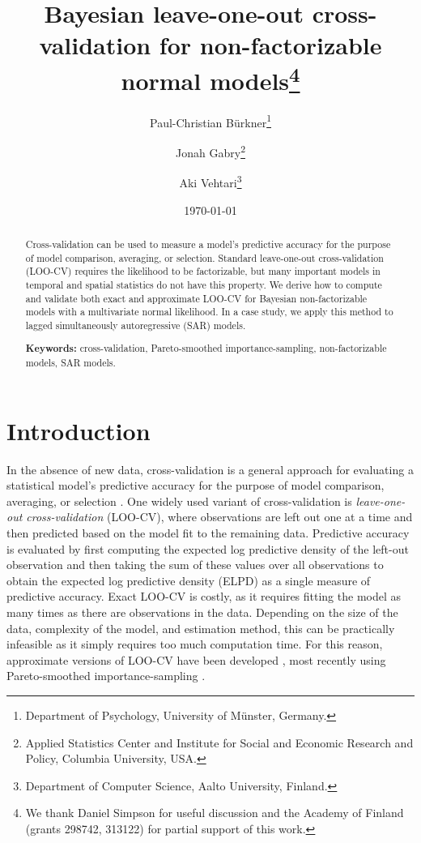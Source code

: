 \documentclass[11pt]{article}
\title{\bf Bayesian leave-one-out cross-validation for non-factorizable normal models\footnote{
We thank Daniel Simpson for useful discussion and the Academy of Finland
(grants 298742, 313122) for partial support of this work.
}\vspace{.1in}}
\author{Paul-Christian B\"{u}rkner\footnote{Department of Psychology, University of M\"{u}nster, Germany.}
  \and Jonah Gabry\footnote{Applied Statistics Center and Institute for Social and Economic Research and Policy, Columbia University, USA.}
  \and Aki Vehtari\footnote{Department of Computer Science, Aalto University, Finland.
}\vspace{.1in}}
\date{\today \vspace{-.1in}}
\begin{document}
\sloppy
\maketitle
\thispagestyle{empty}

\begin{abstract}
Cross-validation can be used to measure a model's predictive accuracy for the
purpose of model comparison, averaging, or selection. Standard leave-one-out
cross-validation  (LOO-CV) requires the likelihood to be factorizable, but many
important models in temporal  and spatial statistics do not have this property.
We derive how to compute and validate both exact and approximate LOO-CV for
Bayesian non-factorizable models with a multivariate normal likelihood.
In a case study, we apply this method to lagged simultaneously autoregressive 
(SAR) models.

\textbf{Keywords:} cross-validation, Pareto-smoothed importance-sampling,
  non-factorizable models, SAR models.
\end{abstract}


\section{Introduction}

In the absence of new data, cross-validation is a general approach for evaluating
a statistical model's predictive accuracy for the purpose of model comparison, 
averaging, or selection \citep{geisser1979, hoeting1999, ando2010, vehtari2012}.
One widely used variant of
cross-validation is \emph{leave-one-out cross-validation} (LOO-CV), where
observations are left out one at a time and then predicted based on the model
fit to the remaining data. Predictive accuracy is evaluated by first computing
the expected log predictive density of the left-out observation and then taking
the sum of these values over all observations to obtain the expected log
predictive density (ELPD) as a single measure of predictive accuracy.
Exact LOO-CV is costly, as it requires fitting the model as many
times as there are observations in the data. Depending on the size of the data,
complexity of the model, and estimation method, this can be practically
infeasible as it simply requires too much computation time. 
For this reason, approximate versions of LOO-CV have been developed 
\citep{gelfand1992, vehtari2017loo}, most recently using 
Pareto-smoothed importance-sampling \citep[PSIS; ][]{vehtari2017loo, vehtari2017psis}.
\end{document}
